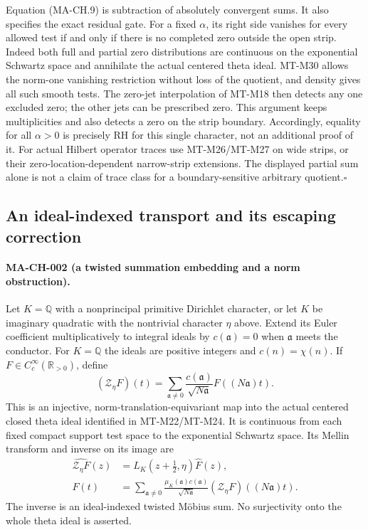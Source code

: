 Equation (MA-CH.9) is subtraction of absolutely convergent
sums.  It also specifies the exact residual gate.  For a
fixed $\alpha$, its right side vanishes for every allowed
test if and only if there is no completed zero outside the
open strip.  Indeed both full and partial zero distributions
are continuous on the exponential Schwartz space and
annihilate the actual centered theta ideal.  MT-M30 allows
the norm-one vanishing restriction without loss of the
quotient, and density gives all such smooth tests.  The
zero-jet interpolation of MT-M18 then detects any one
excluded zero; the other jets can be prescribed zero.
This argument keeps multiplicities and also detects a zero
on the strip boundary.  Accordingly, equality for all
$\alpha>0$ is precisely RH for this single character, not
an additional proof of it.  For actual Hilbert operator
traces use MT-M26/MT-M27 on wide strips, or their
zero-location-dependent narrow-strip extensions.  The
displayed partial sum alone is not a claim of trace class
for a boundary-sensitive arbitrary quotient.\hfill$\square$

\subsection{An ideal-indexed transport and its escaping correction}

\paragraph{MA-CH-002 (a twisted summation embedding and a norm obstruction).}
Let $K=\mathbb Q$ with a nonprincipal primitive Dirichlet
character, or let $K$ be imaginary quadratic with the
nontrivial character $\eta$ above.  Extend its Euler
coefficient multiplicatively to integral ideals by
$c(\mathfrak a)=0$ when $\mathfrak a$ meets the conductor.
For $K=\mathbb Q$ the ideals are positive integers and
$c(n)=\chi(n)$.  If $F\in C_c^\infty(\mathbb R_{>0})$, define
\[
 (\mathcal Z_\eta F)(t)=
       \sum_{\mathfrak a\ne0}
            \frac{c(\mathfrak a)}{\sqrt{N\mathfrak a}}
                           F((N\mathfrak a)t).
 \tag{MA-CH.12}
\]
This is an injective, norm-translation-equivariant map into
the actual centered closed theta ideal identified in
MT-M22/MT-M24.  It is continuous from each fixed compact
support test space to the exponential Schwartz space.
Its Mellin transform and inverse on its image are
\[
 \begin{split}
 \widehat{\mathcal Z_\eta F}(z)
        &=L_K(z+\tfrac12,\eta)\widehat F(z),\\
 F(t)&=\sum_{\mathfrak a\ne0}
    \frac{\mu_K(\mathfrak a)c(\mathfrak a)}{\sqrt{N\mathfrak a}}
             (\mathcal Z_\eta F)((N\mathfrak a)t).
 \end{split}
 \tag{MA-CH.13}
\]
The inverse is an ideal-indexed twisted M\"obius sum.
No surjectivity onto the whole theta ideal is asserted.

